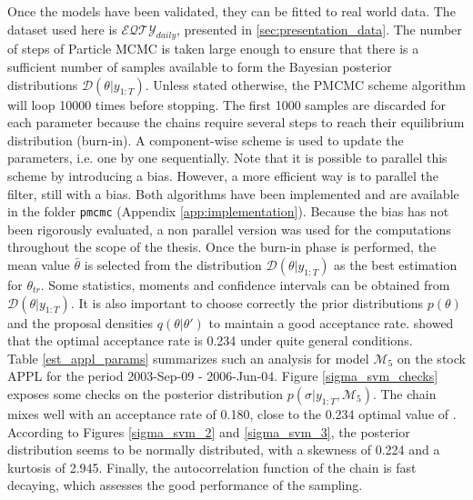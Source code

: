 \documentclass[11pt,a4,twosided,singlespacing,titlepagenumber=on]{scrreprt}
\numberwithin{equation}{chapter} %
\theoremstyle{remark}
\begin{document}
Once the models have been validated, they can be fitted to real world data. The dataset used here is $\mathcal{EQTY}_{daily}$, presented in \ref{sec:presentation_data}. The number of steps of Particle MCMC is taken large enough to ensure that there is a sufficient number of samples available to form the Bayesian posterior distributions $\mathcal{D}(\theta|y_{1:T})$. Unless stated otherwise, the PMCMC scheme algorithm will loop 10000 times before stopping. The first 1000 samples are discarded for each parameter because the chains require several steps to reach their equilibrium distribution (burn-in). A component-wise scheme is used to update the parameters, i.e. one by one sequentially. Note that it is possible to parallel this scheme by introducing a bias. However, a more efficient way is to parallel the filter, still with a bias. Both algorithms have been implemented and are available in the folder \texttt{pmcmc} (Appendix \ref{app:implementation}). Because the bias has not been rigorously evaluated, a non parallel version was used for the computations throughout the scope of the thesis. Once the burn-in phase is performed, the mean value $\bar{\theta}$ is selected from the distribution $\mathcal{D}(\theta|y_{1:T})$ as the best estimation for $\theta_{tr}$. Some statistics, moments and confidence intervals can be obtained from $\mathcal{D}(\theta|y_{1:T})$. It is also important to choose correctly the prior distributions $p(\theta)$ and the proposal densities $q(\theta|\theta')$ to maintain a good acceptance rate. \cite{roberts1997} showed that the optimal acceptance rate is 0.234 under quite general conditions. \\
Table \ref{est_appl_params} summarizes such an analysis for model $\mathcal{M}_5$ on the stock APPL for the period 2003-Sep-09 - 2006-Jun-04. Figure \ref{sigma_svm_checks} exposes some checks on the posterior distribution $p(\sigma|y_{1:T}, \mathcal{M}_5)$. The chain mixes well with an acceptance rate of 0.180, close to the 0.234 optimal value of \cite{roberts1997}. According to Figures \ref{sigma_svm_2} and \ref{sigma_svm_3}, the posterior distribution seems to be normally distributed, with a skewness of 0.224 and a kurtosis of 2.945. Finally, the autocorrelation function of the chain is fast decaying, which assesses the good performance of the sampling.
\end{document}
